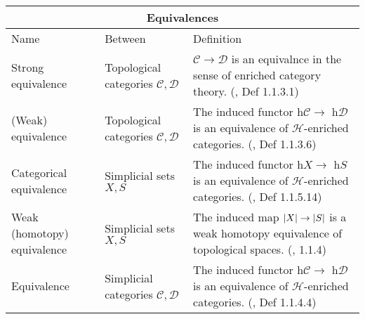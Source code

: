 \documentclass{article}
\begin{document}
\begin{centre}
\begin{tabular}{ |p{5cm}||p{5cm}|p{7cm}|}
 \hline
 \multicolumn{3}{|c|}{Equivalences}\\
 \hline
 Name& Between & Definition\\
  \hline\hline
    Strong equivalence & Topological categories \(\mathcal{C}, \mathcal{D}\) & \(\mathcal{C} \to \mathcal{D}\) is an equivalnce in the sense of enriched category theory. (\autocite{htt}, Def 1.1.3.1)\\
 \hline
  (Weak) equivalence & Topological categories \(\mathcal{C}, \mathcal{D}\) & The induced functor h\(\mathcal{C} \to\) h\(\mathcal{D}\) is an equivalence of \(\mathcal{H}\)-enriched categories. (\autocite{htt}, Def 1.1.3.6)\\
  \hline
  Categorical equivalence & Simplicial sets \(X, S\) & The induced functor h\(X \to\) h\(S\) is an equivalence of \(\mathcal{H}\)-enriched categories. (\autocite{htt}, Def 1.1.5.14)\\
\hline 
 Weak (homotopy) equivalence & Simplicial sets \(X, S\) & The induced map \(\lvert X\rvert \to \lvert S\rvert\) is a weak homotopy equivalence of topological spaces. (\autocite{htt}, 1.1.4)\\
 \hline
 Equivalence & Simplicial categories \(\mathcal{C}, \mathcal{D}\) &The induced functor h\(\mathcal{C} \to\) h\(\mathcal{D}\) is an equivalence of \(\mathcal{H}\)-enriched categories. (\autocite{htt}, Def 1.1.4.4)\\
\hline
\end{tabular}

\text{}

\text{}


\end{centre}
\end{document}
